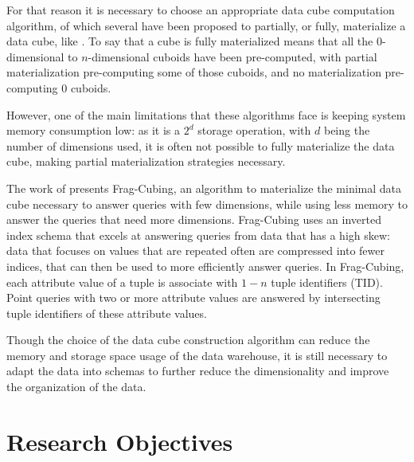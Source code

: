 For that reason it is necessary to choose an appropriate data cube computation algorithm, of which several have been proposed to partially, or fully, materialize a data cube, like \cite{dokaBrownDwarfFullydistributed2011,dongxinCCubingEfficientComputation2006,liSemiClosedCubeEffective2005,liHighdimensionalOLAPMinimal2004,xinComputingIcebergCubes2007}.
To say that a cube is fully materialized means that all the \(0\)-dimensional to \(n\)-dimensional cuboids have been pre-computed, with partial materialization pre-computing some of those cuboids, and no materialization pre-computing $0$ cuboids.

However, one of the main limitations that these algorithms face is keeping system memory consumption low: as it is a $2^d$ storage operation, with $d$ being the number of dimensions used, it is often not possible to fully materialize the data cube, making partial materialization strategies necessary.

The work of \cite{liHighdimensionalOLAPMinimal2004} presents Frag-Cubing, an algorithm to materialize the minimal data cube necessary to answer queries with few dimensions, while using less memory to answer the queries that need more dimensions.
Frag-Cubing uses an inverted index schema that excels at answering queries from data that has a high skew: data that focuses on values that are repeated often are compressed into fewer indices, that can then be used to more efficiently answer queries.
In Frag-Cubing, each attribute value of a tuple is associate with $1-n$ tuple identifiers (TID).
Point queries with two or more attribute values are answered by intersecting tuple identifiers of these attribute values.

Though the choice of the data cube construction algorithm can reduce the memory and storage space usage of the data warehouse, it is still necessary to adapt the data into schemas to further reduce the dimensionality and improve the organization of the data.

\section{Research Objectives}\label{ch:intro:obj}


